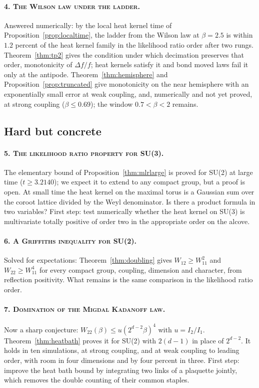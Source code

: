 \paragraph{\normalfont\scshape 4. The Wilson law under the ladder.} Answered numerically: by the local heat kernel time of Proposition~\ref{prop:localtime}, the ladder from the Wilson law at $\beta=2.5$ is within $1.2$ percent of the heat kernel family in the likelihood ratio order after two rungs. Theorem~\ref{thm:tp2} gives the condition under which decimation preserves that order, monotonicity of $\Delta f/f$; heat kernels satisfy it and bond moved laws fail it only at the antipode. Theorem~\ref{thm:hemisphere} and Proposition~\ref{prop:truncated} give monotonicity on the near hemisphere with an exponentially small error at weak coupling, and, numerically and not yet proved, at strong coupling ($\beta\le0.69$); the window $0.7<\beta<2$ remains.

\subsection{Hard but concrete}

\paragraph{\normalfont\scshape 5. The likelihood ratio property for SU(3).} The elementary bound of Proposition~\ref{thm:mlrlarge} is proved for SU(2) at large time ($t\ge3.2140$); we expect it to extend to any compact group, but a proof is open. At small time the heat kernel on the maximal torus is a Gaussian sum over the coroot lattice divided by the Weyl denominator. Is there a product formula in two variables? First step: test numerically whether the heat kernel on SU(3) is multivariate totally positive of order two in the appropriate order on the alcove.

\paragraph{\normalfont\scshape 6. A Griffiths inequality for SU(2).} Solved for expectations: Theorem~\ref{thm:doubling} gives $W_{12}\ge W_{11}^2$ and $W_{22}\ge W_{11}^4$ for every compact group, coupling, dimension and character, from reflection positivity. What remains is the same comparison in the likelihood ratio order.

\paragraph{\normalfont\scshape 7. Domination of the Migdal Kadanoff law.} Now a sharp conjecture: $W_{22}(\beta)\le u(2^{d-2}\beta)^4$ with $u=I_2/I_1$. Theorem~\ref{thm:heatbath} proves it for SU(2) with $2(d-1)$ in place of $2^{d-2}$. It holds in ten simulations, at strong coupling, and at weak coupling to leading order, with room in four dimensions and by four percent in three. First step: improve the heat bath bound by integrating two links of a plaquette jointly, which removes the double counting of their common staples.

